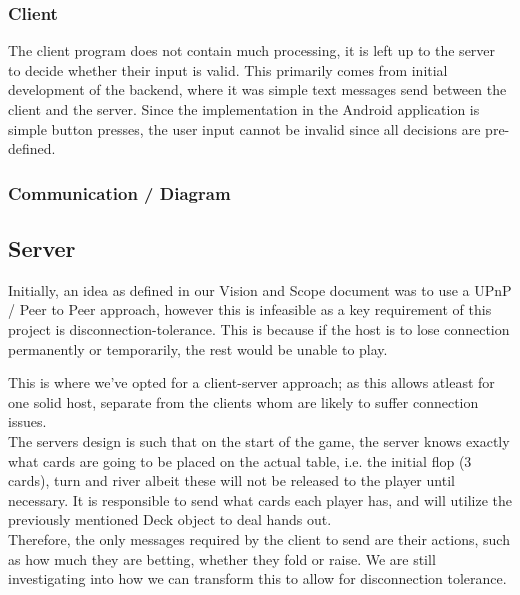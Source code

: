 \documentclass[11pt]{article}
\begin{document}
\subsubsection{Client}

The client program does not contain much processing, it is left up to the server to decide whether their input is valid. This primarily comes from initial development of the backend, where it was simple text messages send between the client and the server. Since the implementation in the Android application is simple button presses, the user input cannot be invalid since all decisions are pre-defined. \\


\subsubsection{Communication / Diagram}






\subsection{Server}

Initially, an idea as defined in our Vision and Scope document was to use a UPnP / Peer to Peer approach, however this is infeasible as a key requirement of this project is disconnection-tolerance. This is because if the host is to lose connection permanently or temporarily, the rest would be unable to play.

This is where we've opted for a client-server approach; as this allows atleast for one solid host, separate from the clients whom are likely to suffer connection issues. \\

The servers design is such that on the start of the game, the server knows exactly what cards are going to be placed on the actual table, i.e. the initial flop (3 cards), turn and river albeit these will not be released to the player until necessary. It is responsible to send what cards each player has, and will utilize the previously mentioned Deck object to deal hands out. \\

Therefore, the only messages required by the client to send are their actions, such as how much they are betting, whether they fold or raise. We are still investigating into how we can transform this to allow for disconnection tolerance.
\end{document}
